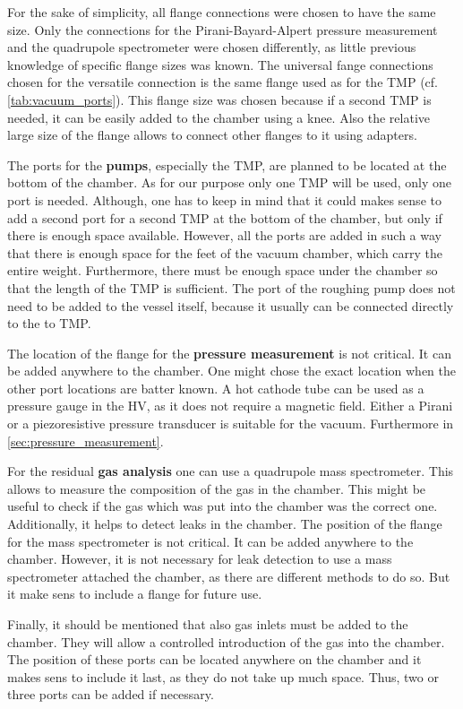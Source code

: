 For the sake of simplicity, all flange connections were chosen to have the same size.
Only the connections for the Pirani-Bayard-Alpert pressure measurement and the quadrupole spectrometer were chosen differently, as little previous knowledge of specific flange sizes was known.
The universal fange connections chosen for the versatile connection is the same flange used as for the TMP (cf. \autoref{tab:vacuum_ports}).
This flange size was chosen because if a second TMP is needed, it can be easily added to the chamber using a knee.
Also the relative large size of the flange allows to connect other flanges to it using adapters.

The ports for the \textbf{pumps}, especially the TMP, are planned to be located at the bottom of the chamber.
As for our purpose only one TMP will be used, only one port is needed.
Although, one has to keep in mind that it could makes sense to add a second port for a second TMP at the bottom of the chamber, but only if there is enough space available.
However, all the ports are added in such a way that there is enough space for the feet of the vacuum chamber, which carry the entire weight.
Furthermore, there must be enough space under the chamber so that the length of the TMP is sufficient.
The port of the roughing pump does not need to be added to the vessel itself, because it usually can be connected directly to the to TMP.

The location of the flange for the \textbf{pressure measurement} is not critical.
It can be added anywhere to the chamber.
One might chose the exact location when the other port locations are batter known.
A hot cathode tube can be used as a pressure gauge in the HV, as it does not require a magnetic field.
Either a Pirani or a piezoresistive pressure transducer is suitable for the vacuum.
Furthermore in \autoref{sec:pressure_measurement}.

For the residual \textbf{gas analysis} one can use a quadrupole mass spectrometer.
This allows to measure the composition of the gas in the chamber.
This might be useful to check if the gas which was put into the chamber was the correct one.
Additionally, it helps to detect leaks in the chamber.
The position of the flange for the mass spectrometer is not critical.
It can be added anywhere to the chamber.
However, it is not necessary for leak detection to use a mass spectrometer attached the chamber, as there are different methods to do so.
But it make sens to include a flange for future use.

Finally, it should be mentioned that also gas inlets must be added to the chamber.
They will allow a controlled introduction of the gas into the chamber.
The position of these ports can be located anywhere on the chamber and it makes sens to include it last, as they do not take up much space.
Thus, two or three ports can be added if necessary.


